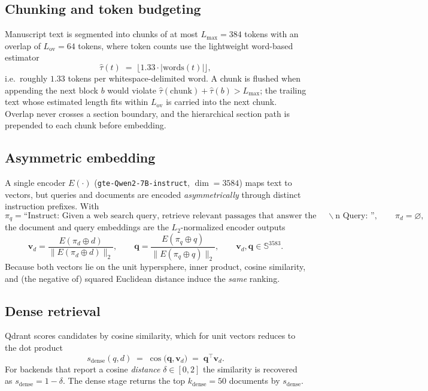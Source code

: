 \documentclass[11pt,a4paper]{article}
\newcommand{\code}[1]{\texttt{\small #1}}
\begin{document}
\subsection{Chunking and token budgeting}
Manuscript text is segmented into chunks of at most $L_{\max}=384$ tokens with an
overlap of $L_{\mathrm{ov}}=64$ tokens, where token counts use the lightweight
word-based estimator
\begin{equation}
  \widehat{\tau}(t) \;=\; \big\lfloor 1.33 \cdot |\mathrm{words}(t)| \big\rfloor ,
\end{equation}
i.e.\ roughly $1.33$ tokens per whitespace-delimited word. A chunk is flushed when
appending the next block $b$ would violate $\widehat{\tau}(\text{chunk}) +
\widehat{\tau}(b) > L_{\max}$; the trailing text whose estimated length fits within
$L_{\mathrm{ov}}$ is carried into the next chunk. Overlap never crosses a section
boundary, and the hierarchical section path is prepended to each chunk before
embedding.

\subsection{Asymmetric embedding}
A single encoder $E(\cdot)$ (\code{gte-Qwen2-7B-instruct}, $\dim = 3584$) maps text
to vectors, but queries and documents are encoded \emph{asymmetrically} through
distinct instruction prefixes. With
\[
  \pi_q = \text{``Instruct: Given a web search query, retrieve relevant passages
  that answer the query}\,\backslash\text{n Query: ''},\qquad \pi_d = \varnothing,
\]
the document and query embeddings are the $L_2$-normalized encoder outputs
\begin{equation}
  \mathbf{v}_{d} = \frac{E(\pi_d \!\oplus\! d)}{\lVert E(\pi_d \!\oplus\! d)\rVert_2},
  \qquad
  \mathbf{q} = \frac{E(\pi_q \!\oplus\! q)}{\lVert E(\pi_q \!\oplus\! q)\rVert_2},
  \qquad \mathbf{v}_d,\mathbf{q}\in\mathbb{S}^{3583}.
\end{equation}
Because both vectors lie on the unit hypersphere, inner product, cosine
similarity, and (the negative of) squared Euclidean distance induce the
\emph{same} ranking.

\subsection{Dense retrieval}
Qdrant scores candidates by cosine similarity, which for unit vectors reduces to
the dot product
\begin{equation}
  s_{\mathrm{dense}}(q,d) \;=\; \cos\!\big(\mathbf{q},\mathbf{v}_d\big)
  \;=\; \mathbf{q}^{\!\top}\mathbf{v}_d .
\end{equation}
For backends that report a cosine \emph{distance} $\delta\in[0,2]$ the
similarity is recovered as $s_{\mathrm{dense}} = 1-\delta$. The dense stage
returns the top $k_{\mathrm{dense}}=50$ documents by $s_{\mathrm{dense}}$.
\end{document}
